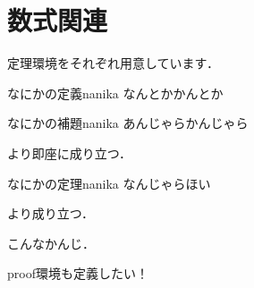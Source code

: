 \section{数式関連}

\par 定理環境をそれぞれ用意しています．

\begin{definition}{なにかの定義}{nanika}
  なんとかかんとか
\end{definition}
\begin{lemma}{なにかの補題}{nanika}
  あんじゃらかんじゃら
\end{lemma}
\par {} より即座に成り立つ．

\begin{theorem}{なにかの定理}{nanika}
  なんじゃらほい
\end{theorem}
\par {} より成り立つ．

こんなかんじ．

\par proof環境も定義したい！
